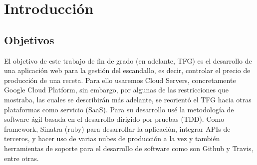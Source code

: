 

%
\chapter{Introducción}\label{intro}

\section{Objetivos}\label{cap.1.1}
El objetivo de este trabajo de fin de grado (en adelante, TFG) es el desarrollo de una aplicación web para la gestión del escandallo, es decir, controlar el precio de producción de una receta. Para ello usaremos Cloud Servers, concretamente Google Cloud Platform, sin embargo, por algunas de las restricciones que mostraba, las cuales se describirán más adelante, se reorientó el TFG hacia otras plataformas como servicio (SaaS). Para su desarrollo usé la metodología de software ágil basada en el desarrollo dirigido por pruebas (TDD). Como framework, Sinatra (ruby) para desarrollar la aplicación, integrar APIs de terceros, y hacer uso de varias nubes de producción a la vez y también herramientas de soporte para el desarrollo de software como son Github y Travis, entre otras.

\vspace*{0.2in}
